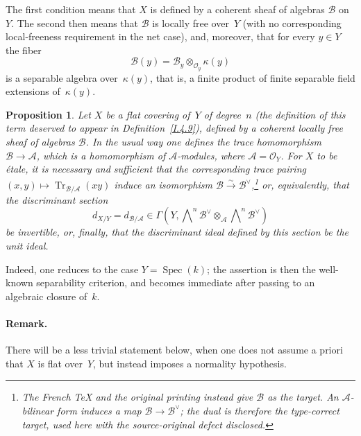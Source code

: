 \documentclass[11pt,oneside]{amsbook}
\newtheorem{proposition}{Proposition}[section]
\begin{document}
The first condition means that \(X\) is defined by a coherent sheaf of
algebras \(\mathcal B\) on~\(Y\).  The second then means that \(\mathcal B\)
is locally free over~\(Y\) (with no corresponding local-freeness requirement
in the net case), and, moreover, that for every \(y\in Y\) the fiber
\[
  \mathcal B(y)=\mathcal B_y\otimes_{\mathcal O_y}\kappa(y)
\]
is a separable algebra over~\(\kappa(y)\), that is, a finite product of
finite separable field extensions of~\(\kappa(y)\).

\begin{proposition}
\label{I.4.10}
Let \(X\) be a flat covering of~\(Y\) of degree~\(n\) (the definition of
this term deserved to appear in Definition~\ref{I.4.9}), defined by a
coherent locally free sheaf of algebras \(\mathcal B\).  In the usual way one
defines the trace homomorphism \(\mathcal B\to\mathcal A\), which is a
homomorphism of \(\mathcal A\)-modules, where
\(\mathcal A=\mathcal O_Y\).  For \(X\) to be étale, it is necessary and
sufficient that the corresponding trace pairing
\((x,y)\longmapsto\operatorname{Tr}_{\mathcal B/\mathcal A}(xy)\) induce an
isomorphism \(\mathcal B\xrightarrow{\sim}\mathcal B^\vee\),\footnote{The French TeX and the
original printing instead give \(\mathcal B\) as the target.  An
\(\mathcal A\)-bilinear form induces a map
\(\mathcal B\to\mathcal B^\vee\); the dual is therefore the type-correct
target, used here with the source-original defect disclosed.} or,
equivalently,
that the \emph{discriminant section}
\[
  d_{X/Y}=d_{\mathcal B/\mathcal A}
  \in
  \Gamma\!\left(
    Y,
    \bigwedge\nolimits^n\mathcal B^\vee
    \otimes_{\mathcal A}
    \bigwedge\nolimits^n\mathcal B^\vee
  \right)
\]
be invertible, or, finally, that the discriminant ideal defined by this
section be the unit ideal.
\end{proposition}

Indeed, one reduces to the case \(Y=\operatorname{Spec}(k)\); the assertion
is then the well-known separability criterion, and becomes immediate after
passing to an algebraic closure of~\(k\).

%
\paragraph{Remark.}
There will be a less trivial statement below, when one does not assume a
priori that \(X\) is flat over~\(Y\), but instead imposes a normality
hypothesis.












\end{document}
